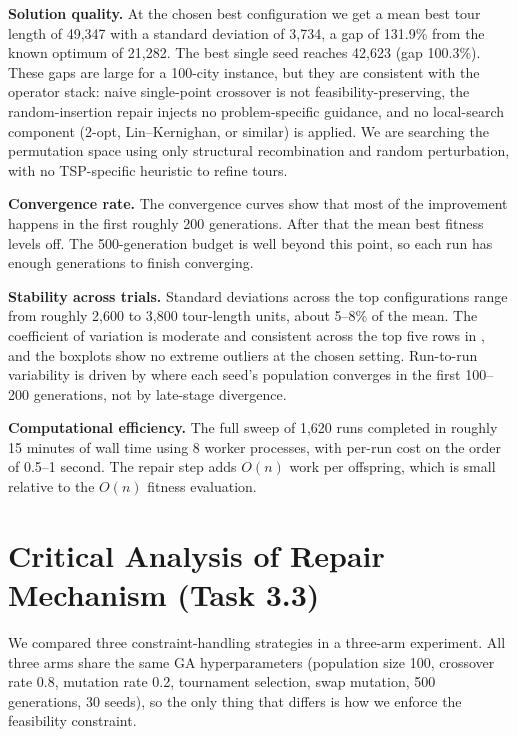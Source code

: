 \textbf{Solution quality.} At the chosen best configuration we get a mean
best tour length of 49,347 with a standard deviation of 3,734, a gap of
131.9\% from the known optimum of 21,282. The best single seed reaches
42,623 (gap 100.3\%). These gaps are large for a 100-city instance, but
they are consistent with the operator stack: naive single-point crossover
is not feasibility-preserving, the random-insertion repair injects no
problem-specific guidance, and no local-search component (2-opt,
Lin--Kernighan, or similar) is applied. We are searching the permutation
space using only structural recombination and random perturbation, with no
TSP-specific heuristic to refine tours.

\textbf{Convergence rate.} The convergence curves show that most of the
improvement happens in the first roughly 200 generations. After that the
mean best fitness levels off. The 500-generation budget is well beyond
this point, so each run has enough generations to finish converging.

\textbf{Stability across trials.} Standard deviations across the top
configurations range from roughly 2,600 to 3,800 tour-length units,
about 5--8\% of the mean. The coefficient of variation is moderate and
consistent across the top five rows in , and the
boxplots show no extreme outliers at the chosen setting. Run-to-run variability is driven
by where each seed's population converges in the first 100--200
generations, not by late-stage divergence.

\textbf{Computational efficiency.} The full sweep of 1,620 runs completed
in roughly 15 minutes of wall time using 8 worker processes, with per-run
cost on the order of 0.5--1 second. The repair step adds $O(n)$ work per
offspring, which is small relative to the $O(n)$ fitness evaluation.

\section{Critical Analysis of Repair Mechanism (Task 3.3)}
\label{T3:RepairCritique}

We compared three constraint-handling strategies in a three-arm
experiment. All three arms share the same GA
hyperparameters (population size 100, crossover rate 0.8, mutation
rate 0.2, tournament selection, swap mutation, 500 generations, 30 seeds),
so the only thing that differs is how we enforce the feasibility
constraint.


